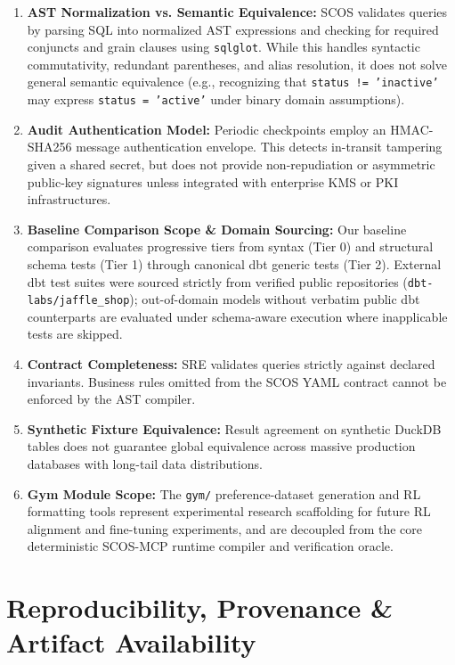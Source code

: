 \documentclass[11pt,a4paper]{article}
\begin{document}
\begin{enumerate}[noitemsep]
    \item \textbf{AST Normalization vs. Semantic Equivalence:} SCOS validates queries by parsing SQL into normalized AST expressions and checking for required conjuncts and grain clauses using \texttt{sqlglot}. While this handles syntactic commutativity, redundant parentheses, and alias resolution, it does not solve general semantic equivalence (e.g., recognizing that \texttt{status != 'inactive'} may express \texttt{status = 'active'} under binary domain assumptions).
    \item \textbf{Audit Authentication Model:} Periodic checkpoints employ an HMAC-SHA256 message authentication envelope. This detects in-transit tampering given a shared secret, but does not provide non-repudiation or asymmetric public-key signatures unless integrated with enterprise KMS or PKI infrastructures.
    \item \textbf{Baseline Comparison Scope \& Domain Sourcing:} Our baseline comparison evaluates progressive tiers from syntax (Tier 0) and structural schema tests (Tier 1) through canonical dbt generic tests (Tier 2). External dbt test suites were sourced strictly from verified public repositories (\texttt{dbt-labs/jaffle\_shop}); out-of-domain models without verbatim public dbt counterparts are evaluated under schema-aware execution where inapplicable tests are skipped.
    \item \textbf{Contract Completeness:} SRE validates queries strictly against declared invariants. Business rules omitted from the SCOS YAML contract cannot be enforced by the AST compiler.
    \item \textbf{Synthetic Fixture Equivalence:} Result agreement on synthetic DuckDB tables does not guarantee global equivalence across massive production databases with long-tail data distributions.
    \item \textbf{Gym Module Scope:} The \texttt{gym/} preference-dataset generation and RL formatting tools represent experimental research scaffolding for future RL alignment and fine-tuning experiments, and are decoupled from the core deterministic SCOS-MCP runtime compiler and verification oracle.
\end{enumerate}


\section{Reproducibility, Provenance \& Artifact Availability}
\label{sec:reproducibility}
\end{document}
